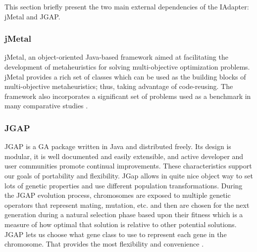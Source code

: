 \documentclass[espaco=umemeio,chapter=TITLE,twoside,openright]{abnt}
\begin{document}
This section briefly present the two main external dependencies of the IAdapter: jMetal and JGAP.

\subsubsection{jMetal}

jMetal, an object-oriented Java-based framework aimed at facilitating the development of metaheuristics for solving multi-objective optimization problems. jMetal provides
a rich set of classes which can be used as the building blocks of multi-objective metaheuristics; thus, taking advantage of code-reusing. The framework also incorporates a significant set of problems used as a benchmark in many comparative studies \cite{Durillo2006}. 

\subsubsection{JGAP}

JGAP  is a GA package written in Java and distributed freely. Its design is modular, it is well documented and
easily extensible, and active developer and user communities
promote continual improvements. These characteristics support our goals of portability and flexibility. JGap allows in quite nice object way to set lots of genetic properties and use different population transformations. During the JGAP evolution process, chromosomes are exposed to multiple genetic operators that represent mating, mutation, etc. and then are chosen for the next generation during a natural selection phase based upon their fitness which is a measure of how optimal that solution is relative to other potential solutions. JGAP lets us choose what gene class to use to represent each gene in the chromosome. That provides the most flexibility and convenience \cite{Fiebrink2005}.


%

%
\end{document}
